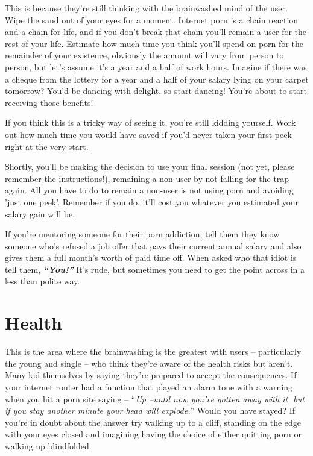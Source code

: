 \documentclass[
]{book}
\begin{document}
This is because they're still thinking with the brainwashed mind of the user. Wipe the sand out of your eyes for a moment. Internet porn is a chain reaction and a chain for life, and if you don't break that chain you'll remain a user for the rest of your life. Estimate how much time you think you'll spend on porn for the remainder of your existence, obviously the amount will vary from person to person, but let's assume it's a year and a half of work hours. Imagine if there was a cheque from the lottery for a year and a half of your salary lying on your carpet tomorrow? You'd be dancing with delight, so start dancing! You're about to start receiving those benefits!

If you think this is a tricky way of seeing it, you're still kidding yourself. Work out how much time you would have saved if you'd never taken your first peek right at the very start.

Shortly, you'll be making the decision to use your final session (not yet, please remember the instructions!), remaining a non-user by not falling for the trap again. All you have to do to remain a non-user is not using porn and avoiding 'just one peek'. Remember if you do, it'll cost you whatever you estimated your salary gain will be.

If you're mentoring someone for their porn addiction, tell them they know someone who's refused a job offer that pays their current annual salary and also gives them a full month's worth of paid time off. When asked who that idiot is tell them, \textbf{\emph{``You!''}} It's rude, but sometimes you need to get the point across in a less than polite way.

\hypertarget{health}{%
\chapter{Health}\label{health}}

This is the area where the brainwashing is the greatest with users -- particularly the young and single -- who think they're aware of the health risks but aren't. Many kid themselves by saying they're prepared to accept the consequences. If your internet router had a function that played an alarm tone with a warning when you hit a porn site saying -- ``\emph{Up --until now you've gotten away with it, but if you stay another minute your head will explode.}'' Would you have stayed? If you're in doubt about the answer try walking up to a cliff, standing on the edge with your eyes closed and imagining having the choice of either quitting porn or walking up blindfolded.
\end{document}
